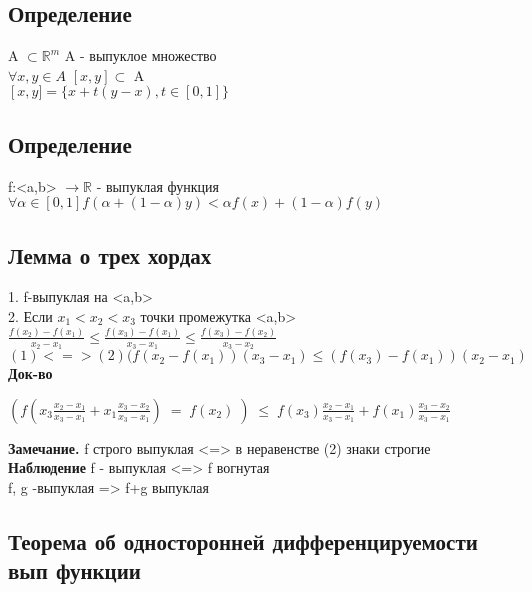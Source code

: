 \documentclass[12pt, a4paper]{article}
\begin{document}
\subsection{Определение}
    A $\subset \mathbb{R}^m$ A - выпуклое множество \\
    $\forall x, y \in A$  $[x,y] \subset$ A \\
    $\left[x,y]=\lbrace x+t(y-x), t \in [0,1] \rbrace$ \\

\subsection{Определение}
    f:<a,b> $\rightarrow \mathbb{R}$ - выпуклая функция \\
    $\forall \alpha \in [0,1] f (\alpha + (1-\alpha)y)< \alpha f(x) + (1-\alpha)f(y)$ \\

\subsection{Лемма о трех хордах}
   1. f-выпуклая на <a,b> \\
   2. Если $x_{1} < x_{2} < x_{3}$  точки промежутка <a,b> \\
   $ \frac{f(x_2)-f(x_1)}{x_2-x_1}\leq\frac{\displaystyle f(x_3)-f(x_1)}{\displaystyle x_3-x_1}\leq\frac{\displaystyle f(x_3)-f(x_2)}{\displaystyle x_3-x_2}$ \\
    $(1) <=> (2) (f(x_2-f(x_1))(x_3 -x_1) \leq (f(x_3)-f(x_{1}))(x_{2}-x_{1})$ \\

\textbf{Док-во}

    $(f(x_3\frac{x_2-x_1}{x_3-x_1}+x_1\frac{x_3-x_2}{x_3-x_1})\;=\;f(x_2)\;)\;\leq\;f(x_3)\frac{x_2-x_1}{x_3-x_1}+f(x_1)\frac{x_3-x_2}{x_3-x_1}$

 \textbf{Замечание.} 
    f строго выпуклая <=> в неравенстве (2) знаки строгие \\
 \textbf{Наблюдение} f - выпуклая <=> f вогнутая \\
    f, g -выпуклая => f+g выпуклая 
 
 \subsection{Теорема об односторонней дифференцируемости вып функции}
 
\end{document}

